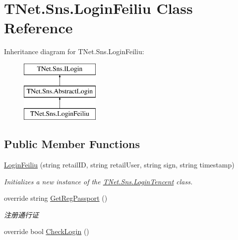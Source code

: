 \hypertarget{class_t_net_1_1_sns_1_1_login_feiliu}{}\section{T\+Net.\+Sns.\+Login\+Feiliu Class Reference}
\label{class_t_net_1_1_sns_1_1_login_feiliu}
Inheritance diagram for T\+Net.\+Sns.\+Login\+Feiliu\+:\begin{figure}[H]
\begin{center}
\leavevmode
\includegraphics[height=3.000000cm]{class_t_net_1_1_sns_1_1_login_feiliu}
\end{center}
\end{figure}
\subsection*{Public Member Functions}
\begin{DoxyCompactItemize}
\item 
\mbox{\hyperlink{class_t_net_1_1_sns_1_1_login_feiliu_a788ea7677c74483fb1dce14dceca574b}{Login\+Feiliu}} (string retail\+ID, string retail\+User, string sign, string timestamp)
\begin{DoxyCompactList}\small\item\em Initializes a new instance of the \mbox{\hyperlink{class_t_net_1_1_sns_1_1_login_tencent}{T\+Net.\+Sns.\+Login\+Tencent}} class. \end{DoxyCompactList}\item 
override string \mbox{\hyperlink{class_t_net_1_1_sns_1_1_login_feiliu_a9a146d3872f6c613a650ad832fd2d68b}{Get\+Reg\+Passport}} ()
\begin{DoxyCompactList}\small\item\em 注册通行证 \end{DoxyCompactList}\item 
override bool \mbox{\hyperlink{class_t_net_1_1_sns_1_1_login_feiliu_a05c5de3660d07218535a0dd4fb77c748}{Check\+Login}} ()
\end{DoxyCompactItemize}
